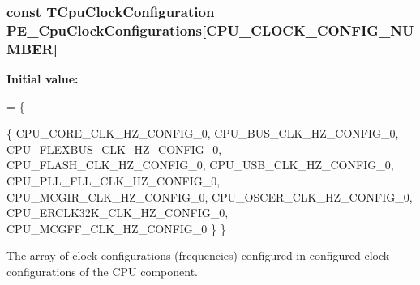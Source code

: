 \subsubsection[{P\+E\+\_\+\+Cpu\+Clock\+Configurations}]{\setlength{\rightskip}{0pt plus 5cm}const {\bf T\+Cpu\+Clock\+Configuration} P\+E\+\_\+\+Cpu\+Clock\+Configurations\mbox{[}C\+P\+U\+\_\+\+C\+L\+O\+C\+K\+\_\+\+C\+O\+N\+F\+I\+G\+\_\+\+N\+U\+M\+B\+E\+R\mbox{]}}\label{group___p_e___l_d_d__module_gab69281f0e90d16198a5595ed7f471441}
{\bfseries Initial value\+:}
\begin{DoxyCode}
= \{
  
  \{
    CPU\_CORE\_CLK\_HZ\_CONFIG\_0,          
    CPU\_BUS\_CLK\_HZ\_CONFIG\_0,           
    CPU\_FLEXBUS\_CLK\_HZ\_CONFIG\_0,       
    CPU\_FLASH\_CLK\_HZ\_CONFIG\_0,         
    CPU\_USB\_CLK\_HZ\_CONFIG\_0,           
    CPU\_PLL\_FLL\_CLK\_HZ\_CONFIG\_0,       
    CPU\_MCGIR\_CLK\_HZ\_CONFIG\_0,         
    CPU\_OSCER\_CLK\_HZ\_CONFIG\_0,         
    CPU\_ERCLK32K\_CLK\_HZ\_CONFIG\_0,      
    CPU\_MCGFF\_CLK\_HZ\_CONFIG\_0          
  \}
\}
\end{DoxyCode}
The array of clock configurations (frequencies) configured in configured clock configurations of the C\+P\+U component. 